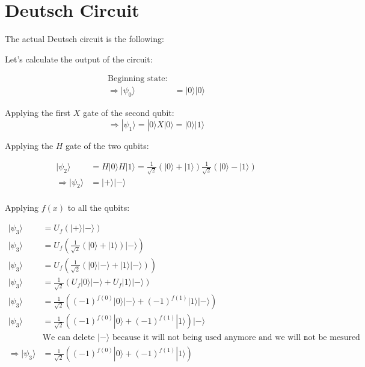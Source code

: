 \documentclass{article}
\begin{document}
\section{Deutsch Circuit}

The actual Deutsch circuit is the following:


Let's calculate the output of the circuit:

\begin{equation}
    \begin{split}
        \text{Beginning state:} & \\
        \Longrightarrow |\psi_0\rangle & = |0\rangle|0\rangle
    \end{split}
\end{equation}

Applying the first $X$ gate of the second qubit:
\begin{equation}
    \Longrightarrow |\psi_1\rangle = |0\rangle X|0\rangle = |0\rangle|1\rangle
\end{equation}

Applying the $H$ gate of the two qubits:

\begin{equation}
    \begin{split}
        |\psi_2\rangle & = H|0\rangle H|1\rangle = \frac{1}{\sqrt{2}}(|0\rangle + |1\rangle)\frac{1}{\sqrt{2}}(|0\rangle - |1\rangle) \\
        \Longrightarrow |\psi_2\rangle & = |+\rangle|-\rangle \\
    \end{split}
\end{equation}

Applying $f(x)$ to all the qubits:

\begin{equation}
    \begin{split}
        |\psi_3\rangle & = U_f(|+\rangle|-\rangle) \\
        |\psi_3\rangle & = U_f(\frac{1}{\sqrt{2}}(|0\rangle + |1\rangle)|-\rangle) \\
        |\psi_3\rangle & = U_f(\frac{1}{\sqrt{2}}(|0\rangle|-\rangle + |1\rangle|-\rangle)) \\
        |\psi_3\rangle & = \frac{1}{\sqrt{2}}(U_f|0\rangle|-\rangle + U_f|1\rangle|-\rangle) \\
        |\psi_3\rangle & = \frac{1}{\sqrt{2}}((-1)^{f(0)}|0\rangle|-\rangle + (-1)^{f(1)}|1\rangle|-\rangle) \\
        |\psi_3\rangle & = \frac{1}{\sqrt{2}}((-1)^{f(0)}|0\rangle + (-1)^{f(1)}|1\rangle)|-\rangle \\
        & \text{We can delete $|-\rangle$ because it will not being used anymore and we will not be mesured}: \\
        \Longrightarrow |\psi_3\rangle & = \frac{1}{\sqrt{2}}((-1)^{f(0)}|0\rangle + (-1)^{f(1)}|1\rangle)
    \end{split}
\end{equation}
\end{document}
